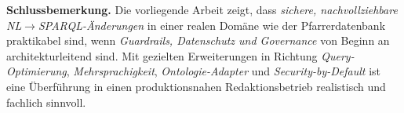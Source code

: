 \medskip
\noindent\textbf{Schlussbemerkung.} 
Die vorliegende Arbeit zeigt, dass \emph{sichere, nachvollziehbare NL$\to$SPARQL-Änderungen} in einer realen Domäne wie der Pfarrerdatenbank praktikabel sind, wenn \emph{Guardrails, Datenschutz und Governance} von Beginn an architekturleitend sind. Mit gezielten Erweiterungen in Richtung \emph{Query-Optimierung}, \emph{Mehrsprachigkeit}, \emph{Ontologie-Adapter} und \emph{Security-by-Default} ist eine Überführung in einen produktionsnahen Redaktionsbetrieb realistisch und fachlich sinnvoll.




